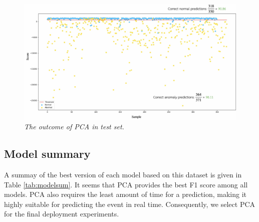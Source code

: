 \begin{figure}[H]
  \centering
  \caption[The outcome of PCA in test set.]{\emph{The outcome of PCA in test set.}} \label{fig:pca-outcome}
  \includegraphics[scale = 0.13]{figures/pca_outcome.jpg}
\end{figure}

\subsection{Model summary}
A summay of the best version of each model based on this dataset is given in Table \ref{tab:modelsum}. It seems that PCA provides the best F1 score among all models. PCA also requires the least amount of time for a prediction, making it highly suitable for predicting the event in real time. Consequently, we select PCA for the final deployment experiments.

